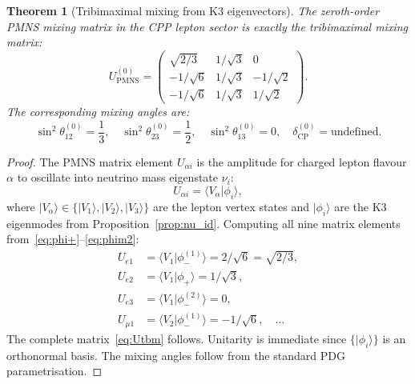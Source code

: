 \documentclass[11pt]{article}
\newtheorem{theorem}{Theorem}[section]
\newcommand{\PMNS}{\mathrm{PMNS}}
\newcommand{\CP}{\mathrm{CP}}
\begin{document}
\begin{theorem}[Tribimaximal mixing from K3 eigenvectors]
\label{thm:tbm}
The zeroth-order PMNS mixing matrix in the CPP lepton sector is
exactly the tribimaximal mixing matrix:
\begin{equation}
U_\PMNS^{(0)} = \begin{pmatrix}
\sqrt{2/3} & 1/\sqrt{3} & 0 \\
-1/\sqrt{6} & 1/\sqrt{3} & -1/\sqrt{2} \\
-1/\sqrt{6} & 1/\sqrt{3} & 1/\sqrt{2}
\end{pmatrix}.
\label{eq:Utbm}
\end{equation}
The corresponding mixing angles are:
\begin{equation}
\sin^2\theta_{12}^{(0)} = \frac{1}{3}, \quad
\sin^2\theta_{23}^{(0)} = \frac{1}{2}, \quad
\sin^2\theta_{13}^{(0)} = 0, \quad
\delta_\CP^{(0)} = \text{undefined}.
\label{eq:tbm_angles}
\end{equation}
\end{theorem}

\begin{proof}
The PMNS matrix element $U_{\alpha i}$ is the amplitude for charged
lepton flavour $\alpha$ to oscillate into neutrino mass eigenstate $\nu_i$:
\begin{equation}
U_{\alpha i} = \langle V_\alpha | \phi_i \rangle,
\end{equation}
where $|V_\alpha\rangle \in \{|V_1\rangle, |V_2\rangle, |V_3\rangle\}$
are the lepton vertex states and $|\phi_i\rangle$ are the K3 eigenmodes
from Proposition~\ref{prop:nu_id}.  Computing all nine matrix elements
from~\eqref{eq:phi+}--\eqref{eq:phim2}:
\begin{align*}
U_{e1} &= \langle V_1|\phi_-^{(1)}\rangle = 2/\sqrt{6} = \sqrt{2/3}, \\
U_{e2} &= \langle V_1|\phi_+\rangle = 1/\sqrt{3}, \\
U_{e3} &= \langle V_1|\phi_-^{(2)}\rangle = 0, \\
U_{\mu 1} &= \langle V_2|\phi_-^{(1)}\rangle = -1/\sqrt{6}, \quad \ldots
\end{align*}
The complete matrix~\eqref{eq:Utbm} follows.  Unitarity is immediate
since $\{|\phi_i\rangle\}$ is an orthonormal basis.  The mixing angles
follow from the standard PDG parametrisation.
\end{proof}
\end{document}
